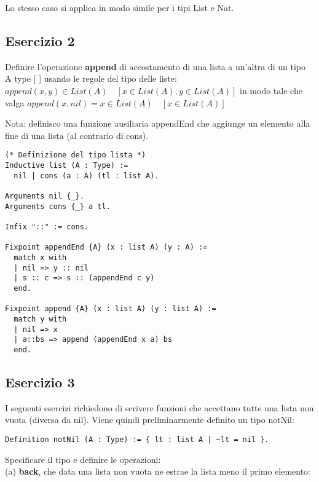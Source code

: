 \begin{prooftree}
\end{prooftree}

Lo stesso caso si applica in modo simile per i tipi List e Nat.

\subsection{Esercizio 2}

Definire l'operazione \textbf{append} di accostamento di una lista a un'altra di un tipo A 
type [ ] usando le regole del tipo delle liste:
$append(x, y) \in List(A) \quad [x \in List(A), y \in List(A)]$
in modo tale che valga $append(x, nil) = x \in List(A) \quad [x \in List(A)]$

Nota: definisco una funzione ausiliaria appendEnd che aggiunge un elemento alla fine 
di una lista (al contrario di cons).

\begin{lstlisting}[language=Coq]
(* Definizione del tipo lista *)
Inductive list (A : Type) :=
  nil | cons (a : A) (tl : list A).

Arguments nil {_}.
Arguments cons {_} a tl.

Infix "::" := cons.

Fixpoint appendEnd {A} (x : list A) (y : A) :=
  match x with
  | nil => y :: nil
  | s :: c => s :: (appendEnd c y)
  end.

Fixpoint append {A} (x : list A) (y : list A) :=
  match y with
  | nil => x
  | a::bs => append (appendEnd x a) bs
  end.
\end{lstlisting}

\subsection{Esercizio 3}

I seguenti esercizi richiedono di scrivere funzioni che accettano tutte una 
lista non vuota (diversa da nil). Viene quindi preliminarmente definito un tipo 
notNil:

\begin{lstlisting}[language=Coq]
Definition notNil (A : Type) := { lt : list A | ~lt = nil }.
\end{lstlisting}

Specificare il tipo e definire le operazioni: \\

(a) \textbf{back}, che data una lista non vuota ne estrae la lista meno il primo elemento:

